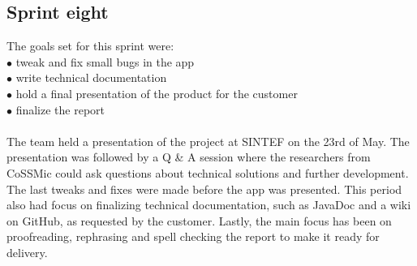 \subsection{Sprint eight}
The goals set for this sprint were:\\
$\bullet$\hspace{0.25cm} tweak and fix small bugs in the app\\
$\bullet$\hspace{0.25cm} write technical documentation\\
$\bullet$\hspace{0.25cm} hold a final presentation of the product for the customer\\
$\bullet$\hspace{0.25cm} finalize the report\\\\
The team held a presentation of the project at SINTEF on the 23rd of May. The presentation was followed by a Q \& A session where the researchers from CoSSMic could ask questions about technical solutions and further development. The last tweaks and fixes were made before the app was presented. This period also had focus on finalizing technical documentation, such as JavaDoc and a wiki on GitHub, as requested by the customer. Lastly, the main focus has been on proofreading, rephrasing and spell checking the report to make it ready for delivery.
